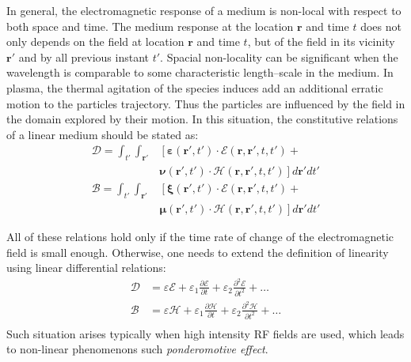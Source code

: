 In general, the electromagnetic response of a medium is non-local with respect to both space and time\parencite{Mackay2010, Brambilla1998}. The medium response at the location $\mathbf{r}$ and time $t$ does not only depends on the field at location $\mathbf{r}$ and time $t$, but of the field in its vicinity $\mathbf{r}'$ and by all previous instant $t'$. Spacial non-locality can be significant when the wavelength is comparable to some characteristic length–scale in the medium. In plasma, the thermal agitation of the species induces add an additional erratic motion to the particles trajectory. Thus the particles are influenced by the field in the domain explored by their motion. In this situation, the constitutive relations of a linear medium should be stated as:
\begin{subequations}
 \begin{align}
  \boldsymbol{\mathcal{D}} = \int_{t'}\int_{\mathbf{r}'} &\left[
  \boldsymbol{\varepsilon}(\mathbf{r}', t') \cdot \boldsymbol{\mathcal{E}}(\mathbf{r},\mathbf{r}', t,t') + \right.\\
  & \left.   \boldsymbol{\nu}(\mathbf{r}', t') \cdot \boldsymbol{\mathcal{H}}(\mathbf{r},\mathbf{r}', t,t')  \right]d\mathbf{r}' dt' \nonumber \\
  \boldsymbol{\mathcal{B}}= \int_{t'}\int_{\mathbf{r}'} &\left[
    \boldsymbol{\xi}(\mathbf{r}', t') \cdot \boldsymbol{\mathcal{E}}(\mathbf{r},\mathbf{r}', t,t') + \right.\\
    & \left. \boldsymbol{\mu}(\mathbf{r}', t') \cdot \boldsymbol{\mathcal{H}}(\mathbf{r},\mathbf{r}', t,t') \right]  d\mathbf{r}' dt' \nonumber
 \end{align}
\end{subequations}



All of these relations hold only if the time rate of change of the electromagnetic field is small enough. Otherwise, one needs to extend the definition of linearity using linear differential relations\parencite{Harrington2001}:
\begin{subequations}
 \begin{align}
  \boldsymbol{\mathcal{D}} &= \varepsilon \boldsymbol{\mathcal{E}} + \varepsilon_1 \frac{\partial \boldsymbol{\mathcal{E}}}{\partial t} + \varepsilon_2 \frac{\partial^2 \boldsymbol{\mathcal{E}}}{\partial t^2} + \ldots \\
  \boldsymbol{\mathcal{B}} &= \varepsilon \boldsymbol{\mathcal{H}} + \varepsilon_1 \frac{\partial \boldsymbol{\mathcal{H}}}{\partial t} + \varepsilon_2 \frac{\partial^2 \boldsymbol{\mathcal{H}}}{\partial t^2} + \ldots \\
 \end{align}
\end{subequations}
Such situation arises typically when high intensity RF fields are used, which leads to non-linear phenomenons such \emph{ponderomotive effect}\parencite{Krapchev1979}.




